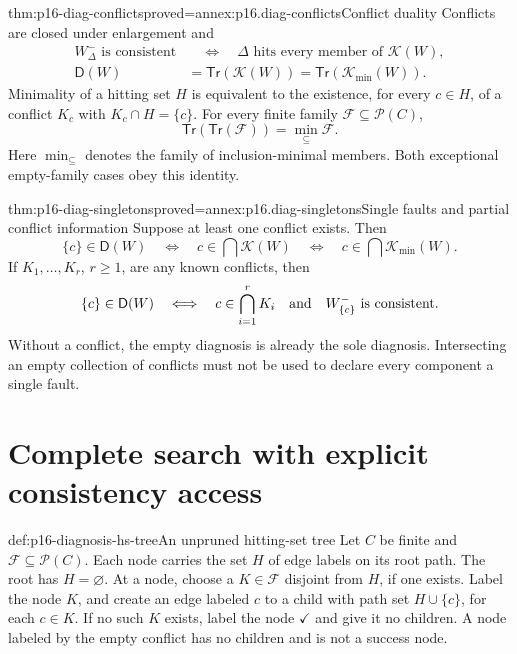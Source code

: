 \begin{hbtheorem}{thm:p16-diag-conflicts}{proved=annex:p16.diag-conflicts}{Conflict duality}
Conflicts are closed under enlargement and
\[
\begin{split}
 W^-_\Delta\text{ is consistent}
   &\quad\Longleftrightarrow\quad
        \Delta\text{ hits every member of }\mathcal K(W),\\
 \mathsf D(W)
   &=\mathsf{Tr}(\mathcal K(W))
     =\mathsf{Tr}(\mathcal K_{\min}(W)).
\end{split}
\]
Minimality of a hitting set \(H\) is equivalent to the existence,
for every \(c\in H\), of a conflict \(K_c\) with
\(K_c\cap H=\{c\}\).
For every finite family \(\mathcal F\subseteq\mathcal P(C)\),
\[
 \mathsf{Tr}(\mathsf{Tr}(\mathcal F))
       =\min_{\subseteq}\mathcal F.
\]
Here \(\min_{\subseteq}\) denotes the family of inclusion-minimal
members. Both exceptional empty-family cases obey this identity.
\end{hbtheorem}

\begin{hbtheorem}{thm:p16-diag-singletons}{proved=annex:p16.diag-singletons}{Single faults and partial conflict information}
Suppose at least one conflict exists. Then
\[
 \{c\}\in\mathsf D(W)
   \quad\Longleftrightarrow\quad
 c\in\bigcap\mathcal K(W)
   \quad\Longleftrightarrow\quad
 c\in\bigcap\mathcal K_{\min}(W).
\]
If \(K_1,\ldots,K_r\), \(r\ge1\), are any known conflicts, then
\[
 \{c\}\in\mathsf D(W)
 \quad\Longleftrightarrow\quad
 c\in\bigcap_{i=1}^rK_i
 \quad\hbox{and}\quad W^-_{\{c\}}\text{ is consistent}.
\]
Without a conflict, the empty diagnosis is already the sole
diagnosis. Intersecting an empty collection of conflicts must not
be used to declare every component a single fault.
\end{hbtheorem}

\section{Complete search with explicit consistency access}
\label{sec:p16-diagnosis-search}

\begin{hbdefinition}{def:p16-diagnosis-hs-tree}{An unpruned hitting-set tree}
Let \(C\) be finite and \(\mathcal F\subseteq\mathcal P(C)\).
Each node carries the set \(H\) of edge labels on its root path.
The root has \(H=\varnothing\). At a node, choose a
\(K\in\mathcal F\) disjoint from \(H\), if one exists.
Label the node \(K\), and create an edge labeled \(c\) to a child
with path set \(H\cup\{c\}\), for each \(c\in K\).
If no such \(K\) exists, label the node \(\checkmark\) and give
it no children. A node labeled by the empty conflict has no
children and is not a success node.
\end{hbdefinition}

